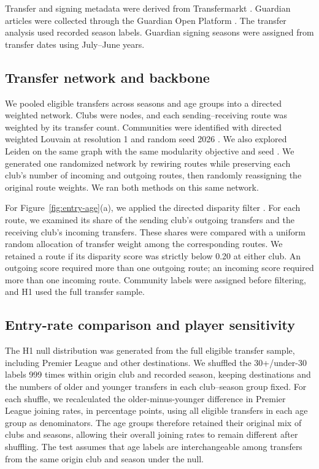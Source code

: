 Transfer and signing metadata were derived from Transfermarkt \cite{transfermarkt_kaggle}. Guardian articles were collected through the Guardian Open Platform \cite{guardian_api}. The transfer analysis used recorded season labels. Guardian signing seasons were assigned from transfer dates using July--June years.

\subsection*{Transfer network and backbone}

We pooled eligible transfers across seasons and age groups into a directed weighted network. Clubs were nodes, and each sending--receiving route was weighted by its transfer count. Communities were identified with directed weighted Louvain at resolution 1 and random seed 2026 \cite{blondel2008louvain,dugue2015directed}. We also explored Leiden on the same graph with the same modularity objective and seed \cite{traag2019leiden}. We generated one randomized network by rewiring routes while preserving each club's number of incoming and outgoing routes, then randomly reassigning the original route weights. We ran both methods on this same network.

For Figure~\ref{fig:entry-age}(a), we applied the directed disparity filter \cite{serrano2009multiscale}. For each route, we examined its share of the sending club's outgoing transfers and the receiving club's incoming transfers. These shares were compared with a uniform random allocation of transfer weight among the corresponding routes. We retained a route if its disparity score was strictly below 0.20 at either club. An outgoing score required more than one outgoing route; an incoming score required more than one incoming route. Community labels were assigned before filtering, and H1 used the full transfer sample.

\subsection*{Entry-rate comparison and player sensitivity}

The H1 null distribution was generated from the full eligible transfer sample, including Premier League and other destinations. We shuffled the 30+/under-30 labels 999 times within origin club and recorded season, keeping destinations and the numbers of older and younger transfers in each club--season group fixed. For each shuffle, we recalculated the older-minus-younger difference in Premier League joining rates, in percentage points, using all eligible transfers in each age group as denominators. The age groups therefore retained their original mix of clubs and seasons, allowing their overall joining rates to remain different after shuffling. The test assumes that age labels are interchangeable among transfers from the same origin club and season under the null.

